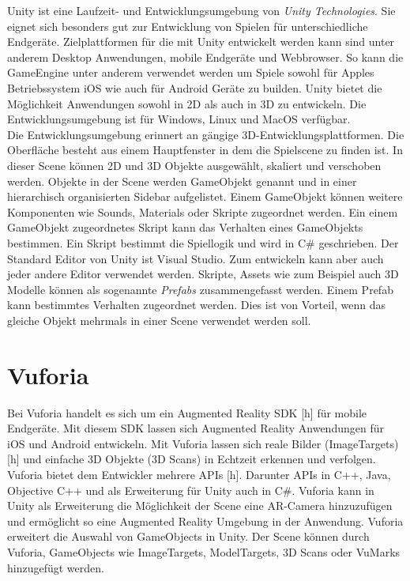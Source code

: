 Unity ist eine Laufzeit- und Entwicklungsumgebung von \textit{Unity Technologies}. Sie eignet sich besonders gut zur Entwicklung von Spielen für unterschiedliche Endgeräte. Zielplattformen für die mit Unity entwickelt werden kann sind unter anderem Desktop Anwendungen, mobile Endgeräte und Webbrowser. So kann die GameEngine unter anderem verwendet werden um Spiele sowohl für Apples Betriebssystem iOS wie auch für Android Geräte zu builden. Unity bietet die Möglichkeit Anwendungen sowohl in 2D als auch in 3D zu entwickeln. Die Entwicklungsumgebung ist für Windows, Linux und MacOS verfügbar. \\
Die Entwicklungsumgebung erinnert an gängige 3D-Entwicklungsplattformen. Die Oberfläche besteht aus einem Hauptfenster in dem die Spielscene zu finden ist. In dieser Scene können 2D und 3D Objekte ausgewählt, skaliert und verschoben werden. Objekte in der Scene werden GameObjekt genannt und in einer hierarchisch organisierten Sidebar aufgelistet. Einem GameObjekt können weitere Komponenten wie Sounds, Materials oder Skripte zugeordnet werden. Ein einem GameObjekt zugeordnetes Skript kann das Verhalten eines GameObjekts bestimmen. Ein Skript bestimmt die Spiellogik und wird in C\# geschrieben. Der Standard Editor von Unity ist Visual Studio. Zum entwickeln kann aber auch jeder andere Editor verwendet werden. Skripte, Assets wie zum Beispiel auch 3D Modelle können als sogenannte \textit{Prefabs} zusammengefasst werden. Einem Prefab kann bestimmtes Verhalten zugeordnet werden. Dies ist von Vorteil, wenn das gleiche Objekt mehrmals in einer Scene verwendet werden soll.


\section{Vuforia}
Bei Vuforia handelt es sich um ein Augmented Reality SDK [h] für mobile Endgeräte. Mit diesem SDK lassen sich Augmented Reality Anwendungen für iOS und Android entwickeln. Mit Vuforia lassen sich reale Bilder (ImageTargets)[h] und einfache 3D Objekte (3D Scans) in Echtzeit erkennen und verfolgen. Vuforia bietet dem Entwickler mehrere APIs [h]. Darunter APIs in C++, Java, Objective C++ und als Erweiterung für Unity auch in C\#. Vuforia kann in Unity als Erweiterung die Möglichkeit der Scene eine AR-Camera hinzuzufügen und ermöglicht so eine Augmented Reality Umgebung in der Anwendung. Vuforia erweitert die Auswahl von GameObjects in Unity. Der Scene können durch Vuforia, GameObjects wie ImageTargets, ModelTargets, 3D Scans oder VuMarks hinzugefügt werden.

